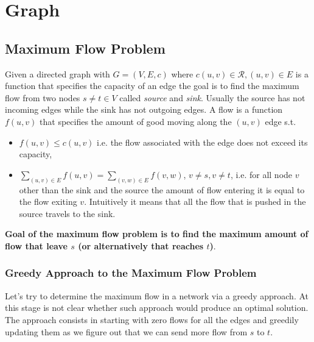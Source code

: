 \chapter{Graph}

\section{Maximum Flow Problem}
Given a directed graph with $G=(V,E,c)$ where  $c(u,v) \in \mathcal{R}, (u,v) \in E$ is a function that specifies the capacity of an edge the goal is to find the maximum flow from two nodes $s \ne t \in V$ called \textit{source} and \textit{sink}. Usually the source has not incoming edges while the sink has not outgoing edges. A flow is a function $f(u,v)$ that specifies the amount of good moving along the $(u,v)$ edge s.t.
\begin{itemize}
	\item $f(u,v) \leq c(u,v)$ i.e. the flow associated with the edge does not exceed its capacity,
	\item $\sum_{(u,v) \in E} f(u,v) = \sum_{(v,w) \in E} f(v,w)$, $v \neq s, v \neq t$, i.e. for all node $v$ other than the sink and the source the amount of flow entering it is equal to the flow exiting $v$. Intuitively it means that all the flow that is pushed in the source travels to the sink.
\end{itemize}
\textbf{Goal of the maximum flow problem is to find the maximum amount of flow that leave $s$ (or alternatively that reaches $t$)}.

\subsection{Greedy Approach to the Maximum Flow Problem}
Let's try to determine the maximum flow in a network via a greedy approach. At this stage is not clear whether such approach would produce an optimal solution.
The approach consists in starting with zero flows for all the edges and greedily updating them as we figure out that we can send more flow from $s$ to $t$.

